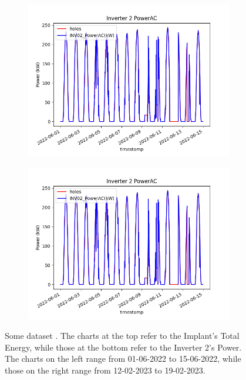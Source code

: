 \begin{figure}[H]
	\begin{subfigure}[t]{0.48\textwidth}
		\centering
		\includegraphics[width=\textwidth, keepaspectratio]{chapters/2_data_preprocessing/imgs/inv02powerbuco1.png}
	\end{subfigure}
	\hspace{0.1cm}
	\begin{subfigure}[t]{0.48\textwidth}
		\centering
		\includegraphics[width=\textwidth, keepaspectratio]{chapters/2_data_preprocessing/imgs/inv02powerbuco1.png}
	\end{subfigure}
	\caption{Some dataset . The charts at the top refer to the Implant's Total Energy, while those at the bottom refer to the Inverter 2's Power. The charts on the left range from 01-06-2022 to 15-06-2022, while those on the right range from 12-02-2023 to 19-02-2023.}\label{fig:graficibuchi}
\end{figure}

